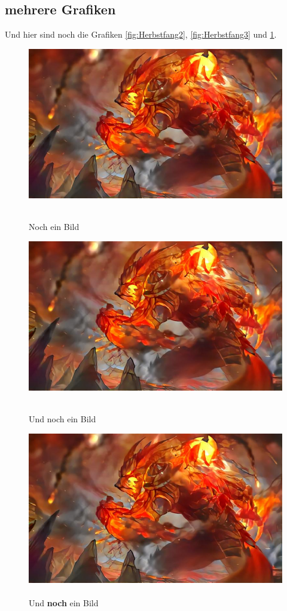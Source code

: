 \documentclass{scrartcl}
\begin{document}
\subsection{mehrere Grafiken}
Und hier sind noch die Grafiken \ref{fig:Herbstfang2}, \ref{fig:Herbstfang3} und \ref{fig:Herbstfang4}.
\FloatBarrier
    \noindent
\begin{figure}[H]
  \includegraphics[width=\linewidth]{Graphics/Herbstfang.jpg}
  \caption{\cite{mylatex}\\Noch ein Bild}\label{fig:Herbstfang2}
\endminipage\hfill
{}
  \includegraphics[width=\linewidth]{Graphics/Herbstfang.jpg}
  \caption{\cite{mylatex}\\Und noch ein Bild}\label{fig:Herbstfang3}
\endminipage\hfill
{}%
  \includegraphics[width=\linewidth]{Graphics/Herbstfang.jpg}
  \caption{\cite{mylatex}\\Und \textbf{noch} ein Bild}\label{fig:Herbstfang4}
\endminipage
    \end{figure}
\end{document}
